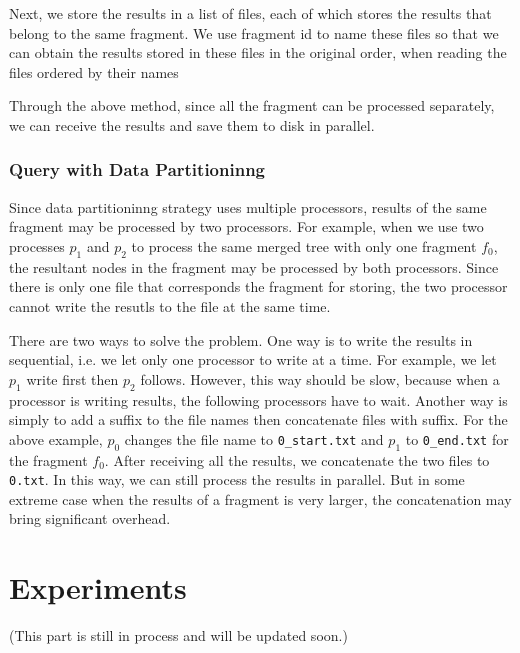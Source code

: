 Next, we store the results in a list of files, each of which stores the results
that belong to the same fragment. We use fragment id to name these files so
that we can obtain the results stored in these files in the original order, when
reading the files ordered by their names

Through the above method, since all the fragment can be processed separately, we
can receive the results and save them to disk in parallel.

\subsubsection{Query with Data Partitioninng}

Since data partitioninng strategy uses multiple processors, results of the same
fragment may be processed by two processors. For example, when we use two
processes $p_1$ and $p_2$ to process the same merged tree with only one fragment
$f_0$, the resultant nodes in the fragment may be processed by both processors.
Since there is only one file that corresponds the fragment for storing, the two
processor cannot write the resutls to the file at the same time.

There are two ways to solve the problem. One way is to write the results in
sequential, i.e. we let only one processor to write at a time. For example, we
let $p_1$ write first then $p_2$ follows. However, this way should be slow, because
when a processor is writing results, the following processors have to wait.
Another way is simply to add a suffix to the file names then concatenate files
with suffix. For the above example, $p_0$ changes the file name to
\texttt{0\_start.txt} and $p_1$ to \texttt{0\_end.txt} for the fragment $f_0$.
After receiving all the results, we concatenate the two files to \texttt{0.txt}.
In this way, we can still process the results in parallel. But in some extreme
case when the results of a fragment is very larger, the concatenation may bring
significant overhead.




\section{Experiments}

(This part is still in process and will be updated soon.)
